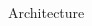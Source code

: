 \documentclass[aspectratio=1610]{beamer}
\begin{document}
\begin{frame}{Architecture}
\begin{onlyenv}
{\begin{columns}
\begin{column}{.3\textwidth}
                \end{column}
            \end{columns}
        }
    \end{onlyenv}
\end{frame}
\end{document}
